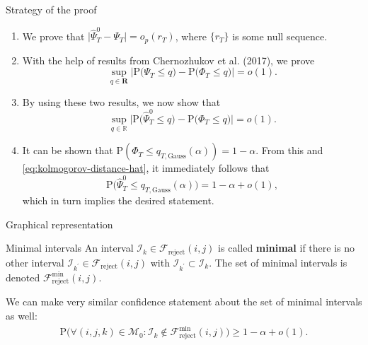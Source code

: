 \documentclass[10pt]{beamer}
\newcommand{\Prob}{\mathrm{P}}
\begin{document}
\begin{frame}{Strategy of the proof}
\begin{enumerate}
\item We prove that  $\big| \hat{\Psi}_T^0 - \Psi_T \big| = o_p(r_T)$, where $\{r_T\}$ is some null sequence.\pause
\item With the help of results from Chernozhukov et al. (2017), we prove
\begin{equation*}\label{eq:kolmogorov-distance}
\sup_{q \in \mathbf{R}} \Big| \Prob\big( \Psi_T \le q \big) - \Prob\big( \Phi_T \le q \big) \Big| = o(1).
\end{equation*}\pause
\item By using these two results, we now show that 
\begin{equation}\label{eq:kolmogorov-distance-hat}
\sup_{q \in \mathbb{R}} \Big| \Prob\big( \hat{\Psi}_T^0 \le q \big) - \Prob\big( \Phi_T \le q \big) \Big| = o(1).
\end{equation}\pause
\item It can be shown that $\Prob (\Phi_T \le q_{T,\text{Gauss}}(\alpha)) = 1-\alpha$. From this and \eqref{eq:kolmogorov-distance-hat}, it immediately follows that  
\begin{equation*}
\Prob\big( \hat{\Psi}_T^0 \le q_{T,\text{Gauss}}(\alpha) \big) = 1 - \alpha + o(1), 
\end{equation*}
which in turn implies the desired statement.
\end{enumerate}
\end{frame}

\begin{frame}{Graphical representation}
\begin{block}{Minimal intervals}
An interval $\mathcal{I}_k \in \mathcal{F}_{\text{reject}}(i, j)$ is called \textbf{minimal} if there is no other interval $\mathcal{I}_{k^\prime} \in \mathcal{F}_{\text{reject}}(i, j)$ with $\mathcal{I}_{k^\prime} \subset \mathcal{I}_k$. The set of minimal intervals is denoted $\mathcal{F}_{\text{reject}}^{\min} (i, j)$.
\end{block}\pause
We can make very similar confidence statement about the set of minimal intervals as well:
\begin{align*}
 \Prob\Big( \forall (i,j,k) \in \mathcal{M}_0: \mathcal{I}_k \notin \mathcal{F}_{\text{reject}}^{\min} (i, j) \Big) \ge 1 - \alpha + o(1).
\end{align*}
\end{frame}
\end{document}
